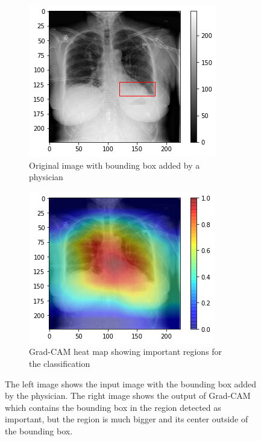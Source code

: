 \begin{figure}[H]
    \centering
    \begin{subfigure}[t]{.45\textwidth}
        \centering
        \includegraphics[width=\linewidth]{chapters/03_classification/images/rise1_bbox.png}
        \caption{Original image with bounding box added by a physician}
    \end{subfigure}\hspace{1cm}%
    \begin{subfigure}[t]{.45\textwidth}
        \centering
        \includegraphics[width=\linewidth]{chapters/03_classification/images/grad-cam_2.png}
        \caption{Grad-CAM heat map showing important regions for the classification}
    \end{subfigure}
    \caption{The left image shows the input image with the bounding box added by the physician. The right image shows the output of Grad-CAM which contains the bounding box in the region detected as important, but the region is much bigger and its center outside of the bounding box.}
\label{grad_cam_example_2}
\end{figure}


